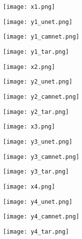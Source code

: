 \documentclass[10pt,twocolumn,letterpaper]{article}
\begin{document}
\begin{figure}[htbp]
	\begin{center}
		\begin{subfigure}[b]{0.24\linewidth}
			\texttt{[image: x1.png]} 
		\end{subfigure}
		\begin{subfigure}[b]{0.24\linewidth}
			\texttt{[image: y1\_unet.png]}
		\end{subfigure}
		\begin{subfigure}[b]{0.24\linewidth}
			\texttt{[image: y1\_camnet.png]}
		\end{subfigure}
		\begin{subfigure}[b]{0.24\linewidth}
			\texttt{[image: y1\_tar.png]}
		\end{subfigure}
		
		\begin{subfigure}[b]{0.24\linewidth}
			\texttt{[image: x2.png]} 
		\end{subfigure}
		\begin{subfigure}[b]{0.24\linewidth}
			\texttt{[image: y2\_unet.png]}
		\end{subfigure}
		\begin{subfigure}[b]{0.24\linewidth}
			\texttt{[image: y2\_camnet.png]}
		\end{subfigure}
		\begin{subfigure}[b]{0.24\linewidth}
			\texttt{[image: y2\_tar.png]}
		\end{subfigure}
		
		\begin{subfigure}[b]{0.24\linewidth}
			\texttt{[image: x3.png]} 
		\end{subfigure}
		\begin{subfigure}[b]{0.24\linewidth}
			\texttt{[image: y3\_unet.png]}
		\end{subfigure}
		\begin{subfigure}[b]{0.24\linewidth}
			\texttt{[image: y3\_camnet.png]}
		\end{subfigure}
		\begin{subfigure}[b]{0.24\linewidth}
			\texttt{[image: y3\_tar.png]}
		\end{subfigure}
		
		\begin{subfigure}[b]{0.24\linewidth}
			\texttt{[image: x4.png]} 
		\end{subfigure}
		\begin{subfigure}[b]{0.24\linewidth}
			\texttt{[image: y4\_unet.png]}
		\end{subfigure}
		\begin{subfigure}[b]{0.24\linewidth}
			\texttt{[image: y4\_camnet.png]}
		\end{subfigure}
		\begin{subfigure}[b]{0.24\linewidth}
			\texttt{[image: y4\_tar.png]}
		\end{subfigure}
		

\end{center}
\end{figure}
\end{document}
